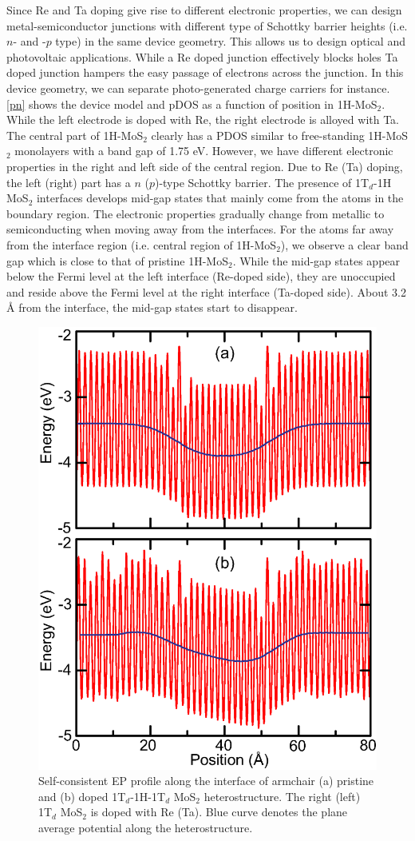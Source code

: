Since Re and Ta doping give rise to different electronic properties, we can design metal-semiconductor
junctions with different type of Schottky barrier heights (i.e. $n$- and -$p$ type) in the same device geometry. This allows us to design 
optical and photovoltaic applications. While a Re doped junction effectively blocks holes Ta doped junction hampers the easy passage of electrons across the junction. In this device geometry, we can separate  photo-generated charge carriers for instance. \autoref{pn} shows the device model and pDOS as a function of position in 1H-MoS$_2$. While the left electrode is doped with Re, the right electrode is alloyed with Ta.  The central part of 1H-MoS$_2$ clearly has a PDOS similar to free-standing 1H-MoS$_2$ monolayers with a band gap of 1.75 eV.  However, we have different electronic properties in the right and left side of the central region.
Due to Re (Ta) doping, the left (right) part has a $n$ ($p$)-type Schottky barrier.  
The presence of 1T$_d$-1H MoS$_2$ interfaces develops mid-gap states that mainly come from the atoms in the
boundary region. The electronic properties gradually change from metallic to semiconducting when moving away from the interfaces.  For the atoms far away from the interface region (i.e. central region of 1H-MoS$_2$), we observe a clear band gap which is close to that of pristine 1H-MoS$_2$. While the mid-gap states appear below the Fermi level at the left interface (Re-doped side), they are unoccupied and reside above the Fermi level at the right interface (Ta-doped side).  About 3.2 {\AA} from the interface, the mid-gap states start to disappear.  

\begin{figure}[htb]
\centering
\includegraphics[width=0.6\linewidth]{potential.eps}
\caption{\label{potential}Self-consistent EP profile along the interface of armchair (a) pristine and (b) doped 1T$_d$-1H-1T$_d$ MoS$_2$ heterostructure.  The right (left) 1T$_d$ MoS$_2$ is doped with Re (Ta). Blue curve denotes the plane average potential along the heterostructure. }
\end{figure}

